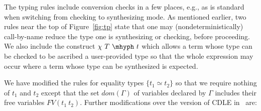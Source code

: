 \documentclass{article}
\begin{document}
The typing rules include conversion checks in a few places, e.g., as is
standard when switching from checking to synthesizing mode.  As mentioned
earlier, two rules near the top of Figure~\ref{fig:tp} state that one may
(nondeterministically) call-by-name reduce the type one is synthesizing or
checking, before proceeding.
We also include the construct $\chi\ T\ \mhyph\ t$ which allows a term whose
type can be checked to be ascribed a user-provided type so that the whole
expression may occur where a term whose type can be synthesized is expected.

We have modified the rules for equality types $\{ t_1 \simeq t_2 \}$ so that we require
nothing of $t_1$ and $t_2$ except that the set $\textit{dom}(\Gamma)$ of variables
declared by $\Gamma$ includes their free variables $\textit{FV}(t_1\ t_2)$.  Further modifications
over the version of CDLE in~\cite{stump18} are:
\end{document}

